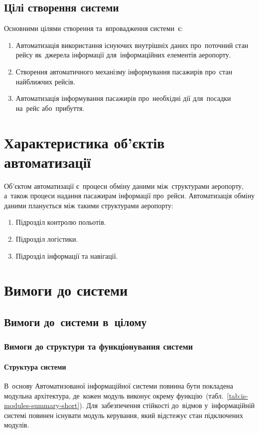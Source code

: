 \documentclass[
	a4paper,
	oneside,
	BCOR = 10mm,
	DIV = 12,
	12pt,
	headings = normal,
]{scrartcl}
\begin{document}
			\subsection{Цілі створення системи}
				Основними цілями створення та~впровадження системи~є:
				\begin{enumerate}[noitemsep]
					\item Автоматизація використання існуючих внутрішніх даних про~поточний стан рейсу як~джерела інформації для~інформаційних елементів аеропорту.
					\item Створення автоматичного механізму інформування пасажирів про~стан найближчих рейсів.
					\item Автоматизація інформування пасажирів про~необхідні дії для~посадки на~рейс або~прибуття.
				\end{enumerate}

	\section{Характеристика об'єктів автоматизації}
		Об'єктом автоматизації є~процеси обміну даними між~структурами аеропорту, а~також процеси надання пасажирам інформації про~рейси. Автоматизація обміну даними планується між такими структурами аеропорту:
		\begin{enumerate}[noitemsep]
			\item Підрозділ контролю польотів.
			\item Підрозділ логістики.
			\item Підрозділ інформації та навігації.
		\end{enumerate}

	\section{Вимоги до системи}
		\subsection{Вимоги до~системи в~цілому}
			\subsubsection{Вимоги до структури та функціонування системи}
				\paragraph{Структура системи}
					В~основу Автоматизованої інформаційної системи повинна бути покладена модульна архітектура, де~кожен модуль виконує окрему функцію~(табл.~\ref{tab:is-modules-summary-short}). Для~забезпечення стійкості до~відмов у~інформаційній системі повинен існувати модуль керування, який відстежує стан підключених модулів.
\end{document}
